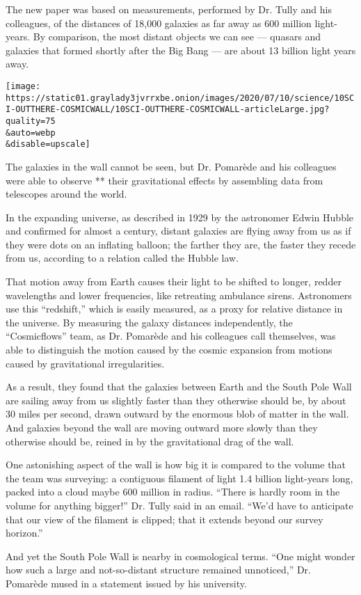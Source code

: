 The new paper was based on measurements, performed by Dr. Tully and his
colleagues, of the distances of 18,000 galaxies as far away as 600
million light-years. By comparison, the most distant objects we can see
--- quasars and galaxies that formed shortly after the Big Bang --- are
about 13 billion light years away.

\texttt{[image: https://static01.graylady3jvrrxbe.onion/images/2020/07/10/science/10SCI-OUTTHERE-COSMICWALL/10SCI-OUTTHERE-COSMICWALL-articleLarge.jpg?quality=75\\\&auto=webp\\\&disable=upscale]}

The galaxies in the wall cannot be seen, but Dr. Pomarède and his
colleagues were able to observe ** their gravitational effects by
assembling data from telescopes around the world.

In the expanding universe, as described in 1929 by the astronomer Edwin
Hubble and confirmed for almost a century, distant galaxies are flying
away from us as if they were dots on an inflating balloon; the farther
they are, the faster they recede from us, according to a relation called
the Hubble law.

That motion away from Earth causes their light to be shifted to longer,
redder wavelengths and lower frequencies, like retreating ambulance
sirens. Astronomers use this ``redshift,'' which is easily measured, as
a proxy for relative distance in the universe. By measuring the galaxy
distances independently, the ``Cosmicflows'' team, as Dr. Pomarède and
his colleagues call themselves, was able to distinguish the motion
caused by the cosmic expansion from motions caused by gravitational
irregularities.

As a result, they found that the galaxies between Earth and the South
Pole Wall are sailing away from us slightly faster than they otherwise
should be, by about 30 miles per second, drawn outward by the enormous
blob of matter in the wall. And galaxies beyond the wall are moving
outward more slowly than they otherwise should be, reined in by the
gravitational drag of the wall.

One astonishing aspect of the wall is how big it is compared to the
volume that the team was surveying: a contiguous filament of light 1.4
billion light-years long, packed into a cloud maybe 600 million in
radius. ``There is hardly room in the volume for anything bigger!'' Dr.
Tully said in an email. ``We'd have to anticipate that our view of the
filament is clipped; that it extends beyond our survey horizon.''

And yet the South Pole Wall is nearby in cosmological terms. ``One might
wonder how such a large and not-so-distant structure remained
unnoticed,'' Dr. Pomarède mused in a statement issued by his university.

